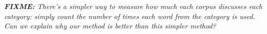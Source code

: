 \documentclass[11pt,a4paper]{article}
\newcommand{\fixme}[1]{{\color{red}\itshape \textbf{FIXME:} {#1}}}
\begin{document}
\fixme{
    There's a simpler way to measure how much each corpus discusses each category:
    simply count the number of times each word from the category is used.
    Can we explain why our method is better than this simpler method?
}

\begin{figure}
\centering
{}


\end{figure}
\end{document}

